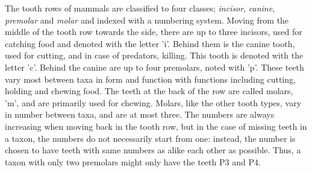 \documentclass{article}
\begin{document}
The tooth rows of mammals are classified to four classes; \textit{incisor}, \textit{canine}, \textit{premolar}
and \textit{molar} and indexed with a numbering system. Moving from the middle of the tooth row
towards the side, there are up to three 
incisors, used for catching food and denoted with the letter 'i'. Behind them is the canine tooth, used for cutting, and 
in case of predators, killing. This tooth is denoted with the letter 'c'. Behind the canine are up to four premolars, noted with 'p'. These 
teeth vary most between taxa in form and function with functions including cutting, holding and chewing food.
The teeth at the back of the row are called molars, 'm', and are primarily used for chewing. Molars, like the other tooth types, 
vary in number between taxa, and are at most three. The numbers are always increasing when moving back in the tooth row, but in
 the case of missing teeth in a taxon, the numbers do not necessarily start from one: instead, the number is chosen to 
have teeth with same numbers as alike each other as possible. Thus, a taxon with only two premolars might only have the teeth P3 and P4.
\end{document}
